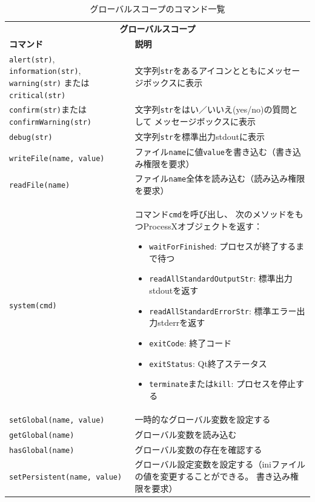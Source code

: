 \begin{table}[H]
  \centering
  \caption{グローバルスコープのコマンド一覧}
  \begin{tabularx}{\linewidth}{XX}
    \hline
    \multicolumn{2}{c}{\textbf{グローバルスコープ}}\\
    \textbf{コマンド} & \textbf{説明}\\
    \hline
    \texttt{alert(str)}, \texttt{information(str)}, \texttt{warning(str)}
    または\texttt{critical(str)}
      & 文字列\texttt{str}をあるアイコンとともにメッセージボックスに表示\\
    \texttt{confirm(str)}または\texttt{confirmWarning(str)}
      & 文字列\texttt{str}をはい／いいえ(yes/no)の質問として
      メッセージボックスに表示\\
    \texttt{debug(str)} & 文字列\texttt{str}を標準出力stdoutに表示\\
    \texttt{writeFile(name, value)}
      & ファイル\texttt{name}に値\texttt{value}を書き込む（書き込み権限を要求）\\
    \texttt{readFile(name)}
      & ファイル\texttt{name}全体を読み込む（読み込み権限を要求）\\
    \texttt{system(cmd)}
      & コマンド\texttt{cmd}を呼び出し、
      次のメソッドをもつProcessXオブジェクトを返す：
      \begin{itemize}
      \item
        \texttt{waitForFinished}: プロセスが終了するまで待つ
      \item
        \texttt{readAllStandardOutputStr}: 標準出力stdoutを返す
      \item
        \texttt{readAllStandardErrorStr}: 標準エラー出力stderrを返す
      \item
        \texttt{exitCode}: 終了コード
      \item
        \texttt{exitStatus}: Qt終了ステータス
      \item
        \texttt{terminate}または\texttt{kill}: プロセスを停止する
      \end{itemize}\\
    \texttt{setGlobal(name, value)} & 一時的なグローバル変数を設定する\\
    \texttt{getGlobal(name)} & グローバル変数を読み込む\\
    \texttt{hasGlobal(name)} & グローバル変数の存在を確認する\\
    \texttt{setPersistent(name, value)}
      & グローバル設定変数を設定する（iniファイルの値を変更することができる。
      書き込み権限を要求）\\

\end{tabularx}
\end{table}
